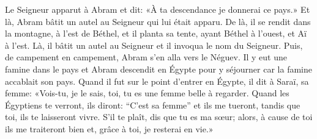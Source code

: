 Le Seigneur apparut à Abram et dit:
	«À ta descendance je donnerai ce pays.»
	Et là, Abram bâtit un autel au Seigneur qui lui était apparu.
De là, il se rendit dans la montagne, à l’est de Béthel,
	et il planta sa tente, ayant Béthel à l’ouest, et Aï à l’est.
	Là, il bâtit un autel au Seigneur et il invoqua le nom du Seigneur.
Puis, de campement en campement, Abram s’en alla vers le Néguev.
Il y eut une famine dans le pays et Abram descendit en Égypte pour y séjourner
	car la famine accablait son pays.
Quand il fut sur le point d’entrer en Égypte, il dit à Saraï, sa femme:
	«Vois-tu, je le sais, toi, tu es une femme belle à regarder.
	Quand les Égyptiens te verront, ils diront: “C’est sa femme”
	et ils me tueront, tandis que toi, ils te laisseront vivre.
S’il te plaît, dis que tu es ma sœur;
	alors, à cause de toi ils me traiteront bien et, grâce à toi, je resterai en vie.»
